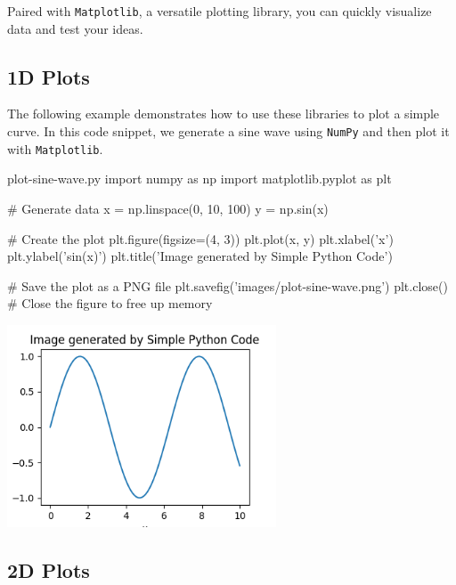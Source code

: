 Paired with \texttt{Matplotlib}, a versatile plotting library, you can quickly visualize data and test your ideas. 

%
\subsection{1D Plots}
The following example demonstrates how to use these libraries to plot a simple curve. In this code snippet, we generate a sine wave using \texttt{NumPy} and then plot it with \texttt{Matplotlib}.

\begin{codeonly}{plot-sine-wave.py}
import numpy as np
import matplotlib.pyplot as plt

# Generate data
x = np.linspace(0, 10, 100)
y = np.sin(x)

# Create the plot
plt.figure(figsize=(4, 3))
plt.plot(x, y)
plt.xlabel('x')
plt.ylabel('sin(x)')
plt.title('Image generated by Simple Python Code')

# Save the plot as a PNG file
plt.savefig('images/plot-sine-wave.png')
plt.close()  # Close the figure to free up memory
\end{codeonly}

\begin{center}
   \includegraphics[width=0.6\textwidth]{images/plot-sine-wave.png}
\end{center}%

%
\subsection{2D Plots}

